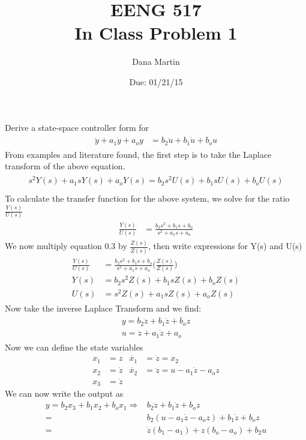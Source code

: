 \documentclass[paper=a4, fontsize=11pt]{scrartcl} %
\title{	
\normalfont \normalsize 
\textsc{EENG 517}\\ 
\huge In Class Problem 1 \\ %
}
\author{Dana Martin} %
\date{\normalsize Due: 01/21/15}
\numberwithin{equation}{section} %
\numberwithin{figure}{section} %
\numberwithin{table}{section} %
\begin{document}
\maketitle %

\begin{section}{}
Derive a state-space controller form for
\begin{align}
\begin{split}
\ddot{y}+a_1\dot{y}+a_oy &= b_2\ddot{u}+b_1\dot{u}+b_ou
\end{split}
\end{align}
From examples and literature found, the first step is to take the Laplace transform of the above equation.
\begin{align}
\begin{split}
s^2Y(s)+a_1sY(s)+a_oY(s)=b_2s^2U(s)+b_1sU(s)+b_oU(s)\\
\end{split}
\end{align}
To calculate the transfer function for the above system, we solve for the ratio $\frac{Y(s)}{U(s)}$
\begin{align}
\begin{split}
\frac{Y(s)}{U(s)}&=\frac{b_2s^2+b_1s+b_o}{s^2+a_1s+a_o}
\end{split}
\end{align}
We now multiply equation 0.3 by $\frac{Z(s)}{Z(s)}$, then write expressions for Y(s) and U(s)
\begin{align}
\begin{split}
\frac{Y(s)}{U(s)}&=\frac{b_2s^2+b_1s+b_o}{s^2+a_1s+a_o}\Bigg(\frac{Z(s)}{Z(s)}\Bigg)\\
Y(s)&=b_2s^2Z(s)+b_1sZ(s)+b_oZ(s)\\
U(s)&=s^2Z(s)+a_1sZ(s)+a_oZ(s)
\end{split}
\end{align}
Now take the inverse Laplace Transform and we find:
\begin{align}
\begin{split}
y=b_2\ddot{z}+b_1\dot{z}+b_oz\\
u=\ddot{z}+a_1\dot{z}+a_o
\end{split}
\end{align}
Now we can define the state variables
\begin{align*}
x_1&=z	 &		\dot{x_1}&=\dot{z}=x_2\\
x_2&=\dot{z} &	\dot{x_2}&=\ddot{z}=u-a_1\dot{z}-a_oz\\
x_3&=\ddot{z}          
\end{align*}
We can now write the output as
\begin{align*}
y=b_2x_3+b_1x_2+b_ox_1\Longrightarrow                         & b_2\ddot{z}+b_1\dot{z}+b_oz\\
=& b_2(u-a_1\dot{z}-a_oz)+b_1\dot{z}+b_oz\\
=&\dot{z}(b_1-a_1)+z(b_o-a_o)+b_2u
\end{align*}


\end{section}
\end{document}
